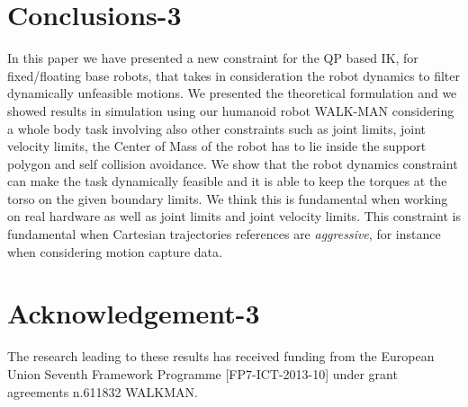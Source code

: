 \section{Conclusions-3}
\label{sec:conclusions3}
In this paper we have presented a new constraint for the QP based IK, for fixed/floating base robots, that takes in consideration the robot dynamics to filter dynamically unfeasible motions. We presented the theoretical formulation and we showed results in simulation using our humanoid robot WALK-MAN considering a whole body task involving also other constraints such as joint limits, joint velocity limits, the Center of Mass of the robot has to lie inside the support polygon and self collision avoidance. We show that the robot dynamics constraint can make the task dynamically feasible and it is able to keep the torques at the torso on the given boundary limits. We think this is fundamental when working on real hardware as well as joint limits and joint velocity limits. This constraint is fundamental when Cartesian trajectories references are \emph{aggressive}, for instance when considering motion capture data. 

\section{Acknowledgement-3}
\label{sec:acknowledgment3}
The research leading to these results has received funding from the European Union Seventh Framework Programme [FP7-ICT-2013-10] under grant agreements n.611832 WALKMAN.